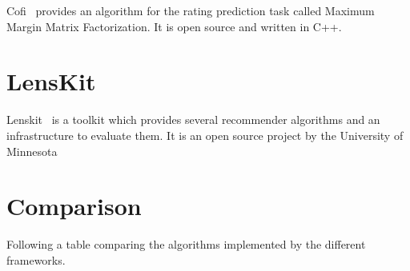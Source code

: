 Cofi~\cite{cofi} provides an algorithm for the rating prediction
task called Maximum Margin Matrix Factorization. It is open source
and written in C++.


\section{LensKit}

Lenskit~\cite{Ekstrand:2011:RRR:2043932.2043958} is a toolkit which provides several recommender
algorithms and an infrastructure to evaluate them. It is an open source
project by the University of Minnesota


\section{Comparison}
Following a table comparing the algorithms implemented by the different
frameworks.

